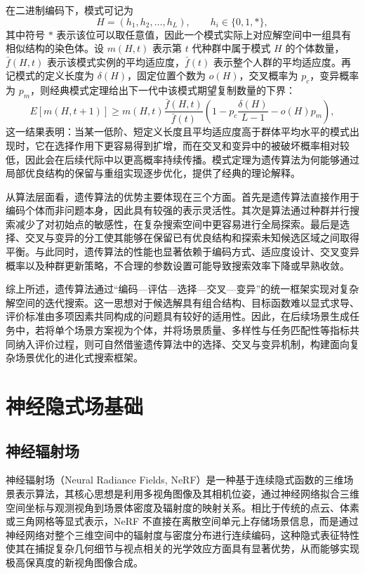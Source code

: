在二进制编码下，模式可记为
\begin{equation}
H=(h_1, h_2, \dots, h_L), \qquad h_i \in \{0,1,*\},
\label{eq:ga_schema}
\end{equation}
其中符号 $*$ 表示该位可以取任意值，因此一个模式实际上对应解空间中一组具有相似结构的染色体。设 $m(H,t)$ 表示第 $t$ 代种群中属于模式 $H$ 的个体数量，$\bar{f}(H,t)$ 表示该模式实例的平均适应度，$\bar{f}(t)$ 表示整个人群的平均适应度。再记模式的定义长度为 $\delta(H)$，固定位置个数为 $o(H)$，交叉概率为 $p_c$，变异概率为 $p_m$，则经典模式定理给出下一代中该模式期望复制数量的下界：
\begin{equation}
E[m(H,t+1)] \ge
m(H,t)\frac{\bar{f}(H,t)}{\bar{f}(t)}
\left(
1-p_c\frac{\delta(H)}{L-1}-o(H)p_m
\right),
\label{eq:ga_schema_theorem}
\end{equation}
这一结果表明：当某一低阶、短定义长度且平均适应度高于群体平均水平的模式出现时，它在选择作用下更容易得到扩增，而在交叉和变异中的被破坏概率相对较低，因此会在后续代际中以更高概率持续传播。模式定理为遗传算法为何能够通过局部优良结构的保留与重组实现逐步优化，提供了经典的理论解释。

从算法层面看，遗传算法的优势主要体现在三个方面。首先是遗传算法直接作用于编码个体而非问题本身，因此具有较强的表示灵活性。其次是算法通过种群并行搜索减少了对初始点的敏感性，在复杂搜索空间中更容易进行全局探索。最后是选择、交叉与变异的分工使其能够在保留已有优良结构和探索未知候选区域之间取得平衡。与此同时，遗传算法的性能也显著依赖于编码方式、适应度设计、交叉变异概率以及种群更新策略，不合理的参数设置可能导致搜索效率下降或早熟收敛。

综上所述，遗传算法通过“编码—评估—选择—交叉—变异”的统一框架实现对复杂解空间的迭代搜索。这一思想对于候选解具有组合结构、目标函数难以显式求导、评价标准由多项因素共同构成的问题具有较好的适用性。因此，在后续场景生成任务中，若将单个场景方案视为个体，并将场景质量、多样性与任务匹配性等指标共同纳入评价过程，则可自然借鉴遗传算法中的选择、交叉与变异机制，构建面向复杂场景优化的进化式搜索框架。


\section{神经隐式场基础}

\subsection{神经辐射场}
\label{sec:nerf}

神经辐射场（Neural Radiance Fields\cite{mildenhall2020nerf}, NeRF）是一种基于连续隐式函数的三维场景表示算法，其核心思想是利用多视角图像及其相机位姿，通过神经网络拟合三维空间坐标与观测视角到场景体密度及辐射度的映射关系。相比于传统的点云、体素或三角网格等显式表示，NeRF 不直接在离散空间单元上存储场景信息，而是通过神经网络对整个三维空间中的辐射度与密度分布进行连续编码，这种隐式表征特性使其在捕捉复杂几何细节与视点相关的光学效应方面具有显著优势，从而能够实现极高保真度的新视角图像合成。


